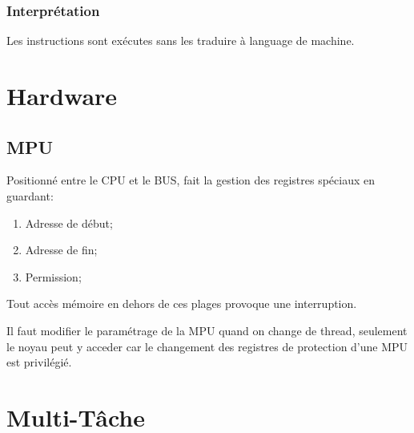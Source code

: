 \documentclass{article}
\begin{document}
\subsubsection{Interprétation}
\begin{definition}
    Les instructions sont exécutes sans les traduire à language de machine.
\end{definition}



\section{Hardware}
\subsection{MPU}
\begin{definition}\label{def:MPU}
    Positionné entre le CPU et le BUS, fait la gestion des registres spéciaux en guardant:
    \begin{enumerate}[noitemsep]
        \item Adresse de début;
        \item Adresse de fin;
        \item Permission;
    \end{enumerate}
    Tout accès mémoire en dehors de ces plages provoque une interruption.

    \begin{remark}
        Il faut modifier le paramétrage de la MPU quand on change de thread, seulement le noyau peut y acceder car le changement des registres de protection d'une MPU est privilégié.
    \end{remark}
\end{definition}



\section{Multi-Tâche}
\end{document}
